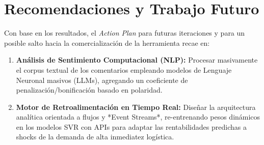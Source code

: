 \section{Recomendaciones y Trabajo Futuro}
Con base en los resultados, el \textit{Action Plan} para futuras iteraciones y para un posible salto hacia la comercialización de la herramienta recae en:
\begin{enumerate}
    \item \textbf{Análisis de Sentimiento Computacional (NLP):} Procesar masivamente el corpus textual de los comentarios empleando modelos de Lenguaje Neuronal masivos (LLMs), agregando un coeficiente de penalización/bonificación basado en polaridad.
    \item \textbf{Motor de Retroalimentación en Tiempo Real:} Diseñar la arquitectura analítica orientada a flujos y *Event Streams*, re-entrenando pesos dinámicos en los modelos SVR con APIs para adaptar las rentabilidades predichas a shocks de la demanda de alta inmediatez logística.
\end{enumerate}

